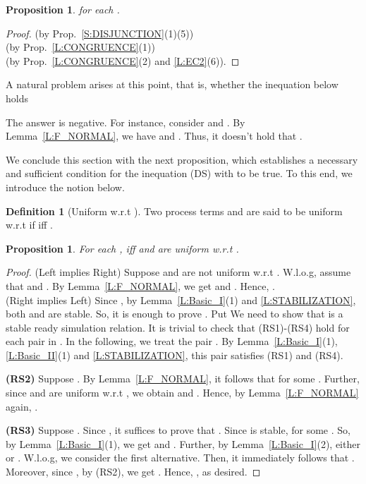 \documentclass{elsarticle}
\theoremstyle{plain}
\newtheorem{proposition}[theorem]{Proposition}
\theoremstyle{definition}
\newtheorem{mydefn}[theorem]{Definition}
\begin{document}
\begin{proposition}\label{S:SPECIAL_I}
 for each .
\end{proposition}
\begin{proof}
     \qquad \;\;\;\; (by Prop.~\ref{S:DISJUNCTION}(1)(5))\\
   (by Prop.~\ref{L:CONGRUENCE}(1))\\
  \qquad \qquad \qquad \qquad(by Prop.~\ref{L:CONGRUENCE}(2) and \ref{L:EC2}(6)).
\end{proof}

A natural problem arises at this point, that is, whether the inequation below holds

The answer is negative.
For instance, consider  and .
By Lemma~\ref{L:F_NORMAL}, we have  and .
Thus, it doesn't hold that .

We conclude this section with the next proposition, which establishes a necessary and sufficient condition for the inequation (DS) with  to be true.
To this end, we introduce the notion below.

\begin{mydefn}[Uniform w.r.t ]
  Two process terms  and  are said to be uniform w.r.t  if  iff .
\end{mydefn}

\begin{proposition}\label{S:SPECIAL}
For each ,
  iff
  and  are uniform w.r.t .
\end{proposition}
\begin{proof}
\noindent (Left implies Right) Suppose  and  are not uniform w.r.t . W.l.o.g, assume that  and . By Lemma~\ref{L:F_NORMAL}, we get  and . Hence, .\\

\noindent (Right implies Left)
Since  , by Lemma~\ref{L:Basic_I}(1) and \ref{L:STABILIZATION}, both  and  are stable. So, it is enough to prove  .
Put 
We need to show that  is a stable ready simulation relation.
It is trivial to check that (RS1)-(RS4) hold for each pair in .
In the following, we treat the pair .
By Lemma~\ref{L:Basic_I}(1), \ref{L:Basic_II}(1) and \ref{L:STABILIZATION}, this pair satisfies (RS1) and (RS4).

\textbf{(RS2)} Suppose . By Lemma~\ref{L:F_NORMAL}, it follows that  for some . Further, since  and  are uniform w.r.t , we obtain  and . Hence, by Lemma~\ref{L:F_NORMAL} again, .

\textbf{(RS3)} Suppose . Since , it suffices to prove that .
Since  is stable,  for some .
So, by Lemma~\ref{L:Basic_I}(1), we get  and .
Further, by Lemma~\ref{L:Basic_I}(2), either  or .
W.l.o.g, we consider the first alternative.
Then, it immediately follows that .
Moreover, since , by (RS2), we get .
Hence, , as desired.
\end{proof}
\end{document}

